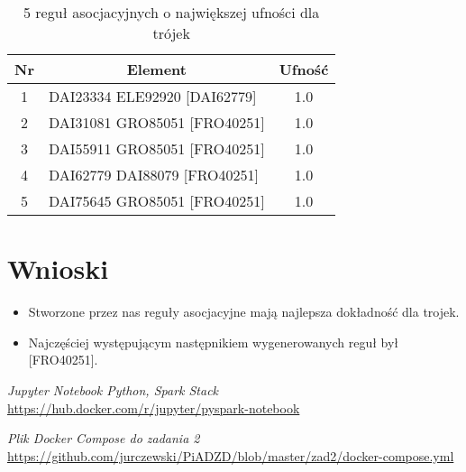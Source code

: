 \documentclass{classrep}
\begin{document}
\begin{table}[H]
\centering
\caption{5 reguł asocjacyjnych o największej ufności dla trójek}
\begin{tabular}{|c|l|c|}
\hline
\rowcolor[HTML]{FFCE93} 
{\color[HTML]{000000} \textbf{Nr}} & \multicolumn{1}{c|}{\cellcolor[HTML]{FFCE93}\textbf{Element}} & \textbf{Ufność} \\ \hline
1                                  & DAI23334 ELE92920 { [}DAI62779{]}                              & 1.0             \\ \hline
2                                  & DAI31081 GRO85051 {[}FRO40251{]}                              & 1.0             \\ \hline
3                                  & DAI55911 GRO85051 {[}FRO40251{]}                              & 1.0             \\ \hline
4                                  & DAI62779 DAI88079 { [}FRO40251{]}                              & 1.0             \\ \hline
5                                  & DAI75645 GRO85051 {[}FRO40251{]}                              & 1.0             \\ \hline
\end{tabular}
\end{table}

\section{Wnioski}

\begin{itemize}
    \item Stworzone przez nas reguły asocjacyjne mają najlepsza dokładność dla trojek.
    \item Najczęściej występującym następnikiem wygenerowanych reguł był [FRO40251].

\end{itemize}

\nocite{*}
\begin{thebibliography}{0}
    
    \textsl{Jupyter Notebook Python, Spark Stack}
    \url{https://hub.docker.com/r/jupyter/pyspark-notebook}

    \textsl{Plik Docker Compose do zadania 2}
    \url{https://github.com/jurczewski/PiADZD/blob/master/zad2/docker-compose.yml}

    
\end{thebibliography}
\end{document}
